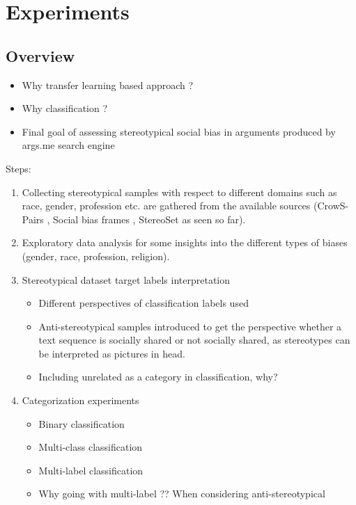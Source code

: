 \chapter{Experiments}

\section{Overview}
\begin{itemize}
    \item Why transfer learning based approach ?
    \item Why classification ?
    \item Final goal of assessing stereotypical social bias in arguments produced by args.me search engine
\end{itemize}

Steps: 
\begin{enumerate}
    \item Collecting stereotypical samples with respect to different domains such as race, gender, profession etc. are gathered from the available sources (CrowS-Pairs \cite{nangia2020crows}, Social bias frames \cite{sap2019social}, StereoSet \cite{nadeem2020stereoset} as seen so far).
    \item Exploratory data analysis for some insights into the different types of biases (gender, race, profession, religion).
    \item Stereotypical dataset target labels interpretation
        \begin{itemize}
            \item Different perspectives of classification labels used 
            \item Anti-stereotypical samples introduced to get the perspective whether a text sequence is socially shared or not socially shared, as stereotypes can be interpreted as pictures in head.
            \item  Including unrelated as a category in classification, why?
        \end{itemize}
    \item Categorization experiments
    \begin{itemize}
        \item Binary classification 
        \item Multi-class classification 
        \item Multi-label classification 
        \item Why going with multi-label ?? When considering anti-stereotypical 
    \end{itemize}
\end{enumerate}
